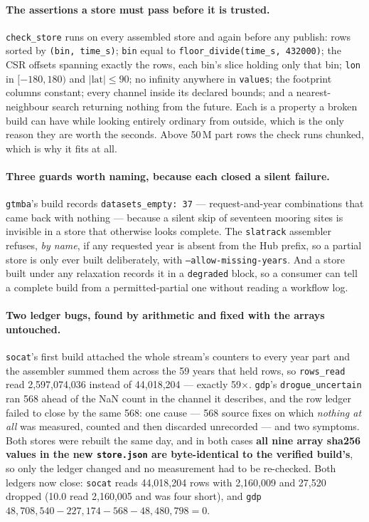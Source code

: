 \documentclass[10pt]{article}
\newcommand{\code}[1]{\texttt{#1}}
\begin{document}
\paragraph{The assertions a store must pass before it is trusted.}
\code{check\_store} runs on every assembled store and again before any publish:
rows sorted by \code{(bin, time\_s)}; \code{bin} equal to
\code{floor\_divide(time\_s, 432000)}; the CSR offsets spanning exactly the rows, each
bin's slice holding only that bin; \code{lon} in $[-180, 180)$ and
$|\mathrm{lat}| \le 90$; no infinity anywhere in \code{values}; the footprint
columns constant; every channel inside its declared bounds; and a
nearest-neighbour search returning nothing from the future. Each is a property a
broken build can have while looking entirely ordinary from outside, which is the
only reason they are worth the seconds. Above 50\,M part rows the check runs
chunked, which is why it fits at all.

\paragraph{Three guards worth naming, because each closed a silent failure.}
\code{gtmba}'s build records \code{datasets\_empty: 37} --- request-and-year
combinations that came back with nothing --- because a silent skip of seventeen
mooring sites is invisible in a store that otherwise looks complete. The
\code{slatrack} assembler refuses, \emph{by name}, if any requested year is
absent from the Hub prefix, so a partial store is only ever built deliberately,
with \code{--allow-missing-years}. And a store built under any relaxation
records it in a \code{degraded} block, so a consumer can tell a complete build
from a permitted-partial one without reading a workflow log.

\paragraph{Two ledger bugs, found by arithmetic and fixed with the arrays
untouched.} \code{socat}'s first build attached the whole stream's counters to
every year part and the assembler summed them across the 59 years that held
rows, so \code{rows\_read} read 2,597,074,036 instead of 44,018,204 --- exactly
59$\times$. \code{gdp}'s \code{drogue\_uncertain} ran 568 ahead of the NaN
count in the channel it describes, and the row ledger failed to close by the
same 568: one cause --- 568 source fixes on which \emph{nothing at all} was
measured, counted and then discarded unrecorded --- and two symptoms. Both stores
were rebuilt the same day, and in both cases \textbf{all nine array sha256
values in the new \code{store.json} are byte-identical to the verified build's},
so only the ledger changed and no measurement had to be re-checked. Both ledgers
now close: \code{socat} reads 44,018,204 rows with 2,160,009 and 27,520 dropped
(10.0 read 2,160,005 and was four short), and \code{gdp}
$48{,}708{,}540 - 227{,}174 - 568 - 48{,}480{,}798 = 0$.
\end{document}
